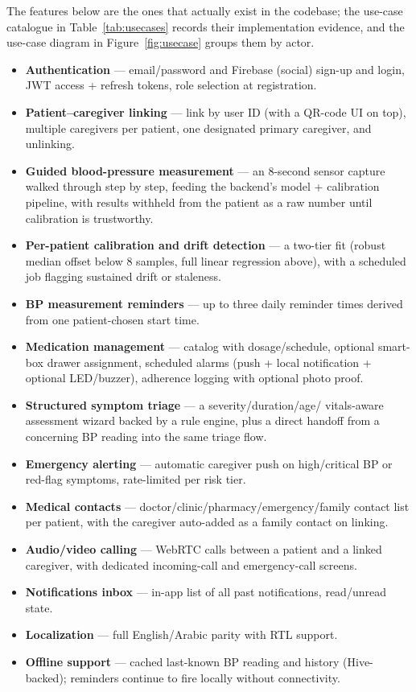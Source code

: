 \documentclass[12pt,a4paper]{report}
\begin{document}
The features below are the ones that actually exist in the codebase; the
use-case catalogue in Table~\ref{tab:usecases} records their implementation
evidence, and the use-case diagram in Figure~\ref{fig:usecase} groups them by
actor.

\begin{itemize}[leftmargin=1.4em]
  \item \textbf{Authentication} --- email/password and Firebase (social)
  sign-up and login, JWT access + refresh tokens, role selection at
  registration.
  \item \textbf{Patient--caregiver linking} --- link by user ID (with a QR-code
  UI on top), multiple caregivers per patient, one designated primary
  caregiver, and unlinking.
  \item \textbf{Guided blood-pressure measurement} --- an 8-second sensor
  capture walked through step by step, feeding the backend's model + calibration
  pipeline, with results withheld from the patient as a raw number until
  calibration is trustworthy.
  \item \textbf{Per-patient calibration and drift detection} --- a two-tier fit
  (robust median offset below 8 samples, full linear regression above), with a
  scheduled job flagging sustained drift or staleness.
  \item \textbf{BP measurement reminders} --- up to three daily reminder times
  derived from one patient-chosen start time.
  \item \textbf{Medication management} --- catalog with dosage/schedule,
  optional smart-box drawer assignment, scheduled alarms (push + local
  notification + optional LED/buzzer), adherence logging with optional photo
  proof.
  \item \textbf{Structured symptom triage} --- a severity/duration/age/
  vitals-aware assessment wizard backed by a rule engine, plus a direct handoff
  from a concerning BP reading into the same triage flow.
  \item \textbf{Emergency alerting} --- automatic caregiver push on
  high/critical BP or red-flag symptoms, rate-limited per risk tier.
  \item \textbf{Medical contacts} --- doctor/clinic/pharmacy/emergency/family
  contact list per patient, with the caregiver auto-added as a family contact
  on linking.
  \item \textbf{Audio/video calling} --- WebRTC calls between a patient and a
  linked caregiver, with dedicated incoming-call and emergency-call screens.
  \item \textbf{Notifications inbox} --- in-app list of all past notifications,
  read/unread state.
  \item \textbf{Localization} --- full English/Arabic parity with RTL support.
  \item \textbf{Offline support} --- cached last-known BP reading and history
  (Hive-backed); reminders continue to fire locally without connectivity.
\end{itemize}
\end{document}
